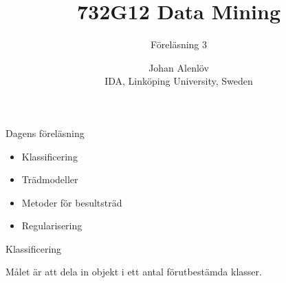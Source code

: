 \documentclass[10pt,english]{beamer}
\title{732G12 Data Mining}
\subtitle{Föreläsning 3}
\date{}
\author{Johan Alenlöv \\ IDA, Linköping University, Sweden}
\begin{document}
\maketitle

\begin{frame}{Dagens föreläsning}
    
    \begin{itemize}
        \item Klassificering
        \item Trädmodeller
        \item Metoder för besultsträd
        \item Regularisering
    \end{itemize}

\end{frame}

\begin{frame}{Klassificering}
    \begin{greenbox}
        Målet är att dela in objekt i ett antal förutbestämda klasser.
    \end{greenbox}
\end{frame}
\end{document}
